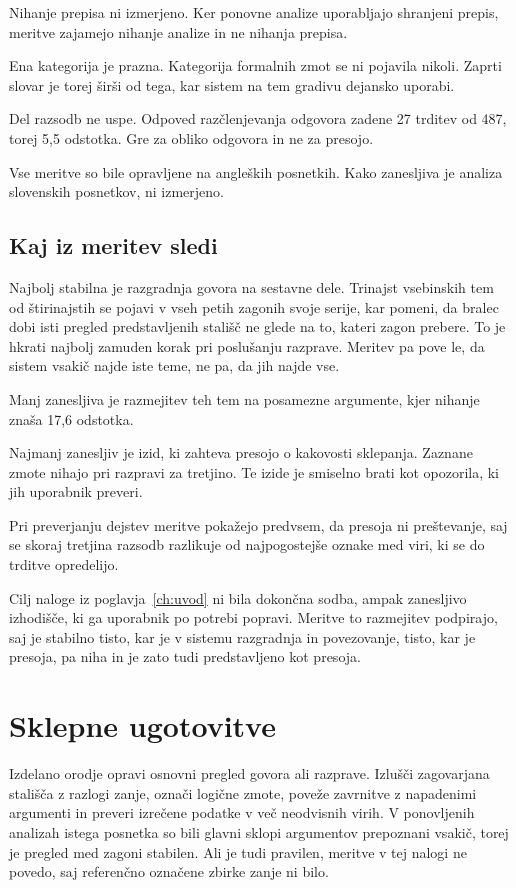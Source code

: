 \documentclass[a4paper, 12pt]{book}
\begin{document}
Nihanje prepisa ni izmerjeno. Ker ponovne analize uporabljajo shranjeni prepis,
meritve zajamejo nihanje analize in ne nihanja prepisa.

Ena kategorija je prazna. Kategorija formalnih zmot se ni pojavila nikoli.
Zaprti slovar je torej širši od tega, kar sistem na tem gradivu dejansko
uporabi.

Del razsodb ne uspe. Odpoved razčlenjevanja odgovora zadene 27 trditev od 487,
torej 5,5 odstotka. Gre za obliko odgovora in ne za presojo.

Vse meritve so bile opravljene na angleških posnetkih. Kako zanesljiva je
analiza slovenskih posnetkov, ni izmerjeno.

\section{Kaj iz meritev sledi}
\label{sec:sklepi-meritev}

Najbolj stabilna je razgradnja govora na sestavne dele. Trinajst vsebinskih tem
od štirinajstih se pojavi v vseh petih zagonih svoje serije, kar pomeni, da
bralec dobi isti pregled predstavljenih stališč ne glede na to, kateri zagon
prebere. To je hkrati najbolj zamuden korak pri poslušanju razprave. Meritev pa
pove le, da sistem vsakič najde iste teme, ne pa, da jih najde vse.

Manj zanesljiva je razmejitev teh tem na posamezne argumente, kjer nihanje znaša
17,6 odstotka. 

Najmanj zanesljiv je izid, ki zahteva presojo o kakovosti sklepanja. Zaznane
zmote nihajo pri razpravi za tretjino. Te izide je smiselno brati kot opozorila,
ki jih uporabnik preveri.

Pri preverjanju dejstev meritve pokažejo predvsem, da presoja ni preštevanje, saj
se skoraj tretjina razsodb razlikuje od najpogostejše oznake med viri, ki se do
trditve opredelijo. 

Cilj naloge iz poglavja~\ref{ch:uvod} ni bila dokončna sodba, ampak zanesljivo
izhodišče, ki ga uporabnik po potrebi popravi. Meritve to razmejitev podpirajo,
saj je stabilno tisto, kar je v sistemu razgradnja in povezovanje, tisto, kar je
presoja, pa niha in je zato tudi predstavljeno kot presoja.

\chapter{Sklepne ugotovitve}
\label{ch:sklep}

Izdelano orodje opravi osnovni pregled govora ali razprave. Izlušči zagovarjana
stališča z razlogi zanje, označi logične zmote, poveže zavrnitve z napadenimi
argumenti in preveri izrečene podatke v več neodvisnih virih. V ponovljenih
analizah istega posnetka so bili glavni sklopi argumentov prepoznani vsakič,
torej je pregled med zagoni stabilen. Ali je tudi pravilen, meritve v tej nalogi
ne povedo, saj referenčno označene zbirke zanje ni bilo.
\end{document}

